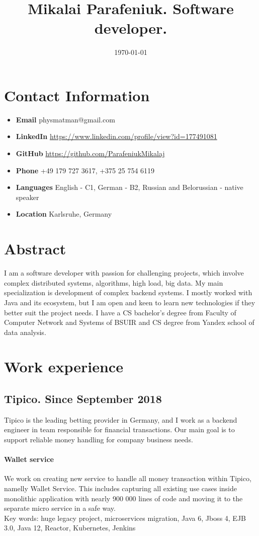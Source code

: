 \documentclass{article}
\title{Mikalai Parafeniuk. Software developer.}
\date{\today}
\begin{document}
\maketitle

\section*{Contact Information}
\begin{itemize}
\item \textbf{Email} physmatman@gmail.com
\item \textbf{LinkedIn} \url{https://www.linkedin.com/profile/view?id=177491081}
\item \textbf{GitHub} \url{https://github.com/ParafeniukMikalaj}
\item \textbf{Phone} +49 179 727 3617, +375 25 754 6119 
\item \textbf{Languages} English - C1, German - B2, Russian and Belorussian - native speaker
\item \textbf{Location} Karlsruhe, Germany
\end{itemize}

\section*{Abstract}
I am a software developer with passion for challenging projects, which involve complex distributed systems, algorithms, high load, big data. My main specialization is development of complex backend systems. I mostly worked with Java and its ecosystem, but I am open and keen to learn new technologies if they better suit the project needs. I have a CS bachelor's degree from Faculty of Computer Network and Systems of BSUIR and CS degree from Yandex school of data analysis.

\section*{Work experience}

\subsection*{Tipico. Since September 2018}
Tipico is the leading betting provider in Germany, and I work as a backend engineer in team responsible for financial transactions. Our main goal is to support reliable money handling for company business needs.

\paragraph{Wallet service} We work on creating new service to handle all money transaction within Tipico, namelly Wallet Service. This includes capturing all existing use cases inside monolithic application with nearly 900 000 lines of code and moving it to the separate micro service in a safe way.\\
Key words: huge legacy project, microservices migration, Java 6, Jboss 4, EJB 3.0, Java 12, Reactor, Kubernetes, Jenkins
\end{document}

